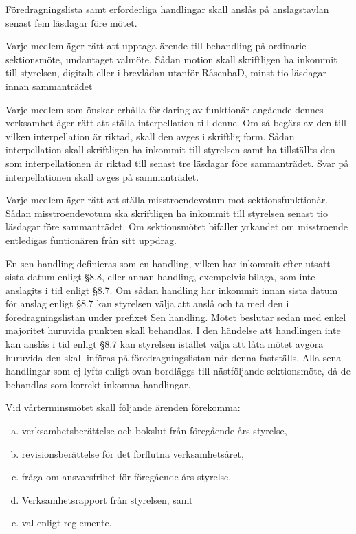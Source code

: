 \documentclass[stadgar]{dsekprotokoll}
\begin{document}
\begin{stadgeavsnitt}

Föredragningslista samt erforderliga handlingar skall anslås på
anslagstavlan senast fem läsdagar före mötet.


Varje medlem äger rätt att upptaga ärende till behandling
på ordinarie sektionsmöte, undantaget valmöte. Sådan motion skall skriftligen ha inkommit till styrelsen, digitalt eller i brevlådan utanför RåsenbaD, minst tio läsdagar innan sammanträdet

Varje medlem som önskar erhålla förklaring av funktionär angående
dennes verksamhet äger rätt att ställa interpellation till denne. Om
så begärs av den till vilken interpellation är riktad, skall den avges
i skriftlig form. Sådan interpellation skall skriftligen ha inkommit
till styrelsen samt ha tillställts den som interpellationen är riktad
till senast tre läsdagar före sammanträdet. Svar på
interpellationen skall avges på sammanträdet. 


Varje medlem äger rätt att ställa misstroendevotum mot
sektionsfunktionär. Sådan misstroendevotum ska skriftligen ha inkommit
till styrelsen senast tio läsdagar före
sammanträdet. Om sektionsmötet bifaller yrkandet om misstroende
entledigas funtionären från sitt uppdrag.

En sen handling definieras som en handling, vilken har inkommit efter utsatt sista datum enligt
\S8.8, eller annan handling, exempelvis bilaga, som inte anslagits i tid enligt \S8.7. Om sådan
handling har inkommit innan sista datum för anslag enligt \S8.7 kan styrelsen välja att anslå och
ta med den i föredragningslistan under prefixet Sen handling. Mötet beslutar sedan med enkel
majoritet huruvida punkten skall behandlas. I den händelse att handlingen inte kan anslås i
tid enligt \S8.7 kan styrelsen istället välja att låta mötet avgöra huruvida den skall införas på föredragningslistan
när denna fastställs. Alla sena handlingar som ej lyfts enligt ovan bordläggs
till nästföljande sektionsmöte, då de behandlas som korrekt inkomna handlingar.


Vid vårterminsmötet skall följande ärenden förekomma:
\begin{enumerate}[a)]
\item verksamhetsberättelse och bokslut från föregående års styrelse,
\item revisionsberättelse för det förflutna verksamhetsåret,
\item fråga om ansvarsfrihet för föregående års styrelse, 
\item Verksamhetsrapport från styrelsen, samt
\item val enligt reglemente.
\end{enumerate}


\end{stadgeavsnitt}
\end{document}
